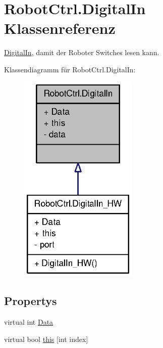 \hypertarget{class_robot_ctrl_1_1_digital_in}{
\section{RobotCtrl.DigitalIn Klassenreferenz}
\label{class_robot_ctrl_1_1_digital_in}
}


\hyperlink{class_robot_ctrl_1_1_digital_in}{DigitalIn}, damit der Roboter Switches lesen kann.  




Klassendiagramm für RobotCtrl.DigitalIn:\nopagebreak
\begin{figure}[H]
\begin{center}
\leavevmode
\includegraphics[width=160pt]{class_robot_ctrl_1_1_digital_in__inherit__graph}
\end{center}
\end{figure}
\subsection*{Propertys}
\begin{DoxyCompactItemize}
\item 
virtual int \hyperlink{class_robot_ctrl_1_1_digital_in_a9f730b21d4845684a1e085293d2cba50}{Data}
\item 
virtual bool \hyperlink{class_robot_ctrl_1_1_digital_in_adabed7783bc3ad5603e1adbf2bc37484}{this} \mbox{[}int index\mbox{]}
\end{DoxyCompactItemize}


